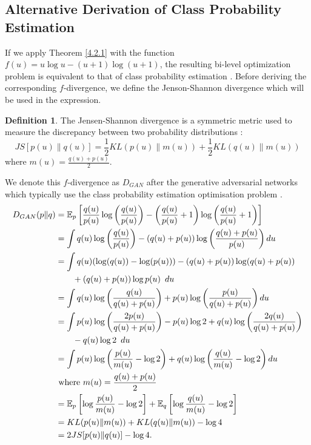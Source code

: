 \documentclass[honours,12pt]{unswthesis}
\newcommand{\E}{\mathbb{E}}
\numberwithin{equation}{section}
\theoremstyle{definition}
\newtheorem{definition}[theorem]{Definition}
\begin{document}
\subsection{Alternative Derivation of Class Probability Estimation}\label{sec:4.2.4}
If we apply Theorem \ref{4.2.1} with the function $f(u)=u\log u-(u+1)\log (u+1)$, the resulting bi-level optimization problem is equivalent to that of class probability estimation \citep{tiao}. Before deriving the corresponding $f$-divergence, we define the Jenson-Shannon divergence which will be used in the expression.
\begin{definition}
The Jensen-Shannon divergence is a symmetric metric used to measure the discrepancy between two probability distributions \citep{JS}:
\[JS[p(u)\|q(u)]=\frac12 KL(p(u)\|m(u))+\frac12 KL(q(u)\|m(u))\]
where $m(u)=\frac{q(u)+p(u)}{2}$.
\end{definition}
We denote this $f$-divergence as $D_{GAN}$ after the generative adversarial networks which typically use the class probability estimation optimisation problem \citep{gan}.
\begin{align*}
D_{GAN}(p\|q)&= \E_p\left[\frac{q(u)}{p(u)}\log \left(\frac{q(u)}{p(u)}\right)-\left(\frac{q(u)}{p(u)}+1 \right)\log\left(\frac{q(u)}{p(u)}+1\right)\right]\\
&= \int q(u)\log\left(\frac{q(u)}{p(u)}\right)-(q(u)+p(u))\log\left(\frac{q(u)+p(u)}{p(u)}\right)du\\
&= \int q(u)(\log(q(u))-\log(p(u)))-(q(u)+p(u))\log(q(u)+p(u))\\
&\qquad +(q(u)+p(u))\log p(u)\enskip du\\
&= \int q(u)\log\left(\frac{q(u)}{q(u)+p(u)}\right)+p(u)\log \left(\frac{p(u)}{q(u)+p(u)}\right) du\\
&= \int p(u)\log \left(\frac{2p(u)}{q(u)+p(u)}\right)-p(u)\log 2+q(u)\log \left(\frac{2q(u)}{q(u)+p(u)}\right)\\
&\qquad -q(u)\log 2\enskip du\\
&= \int p(u)\log \left(\frac{p(u)}{m(u)}-\log 2\right)+q(u)\log \left(\frac{q(u)}{m(u)}-\log 2\right)du\\
&\text{ where }m(u)=\frac{q(u)+p(u)}{2}\\
&= \E_p \left[\log \frac{p(u)}{m(u)}-\log 2\right]+\E_q\left[\log\frac{q(u)}{m(u)}-\log 2\right]\\
&= KL(p(u)\|m(u))+KL(q(u)\|m(u))-\log 4\\
&= 2JS[p(u)\|q(u)]-\log 4.
\end{align*}
\end{document}
